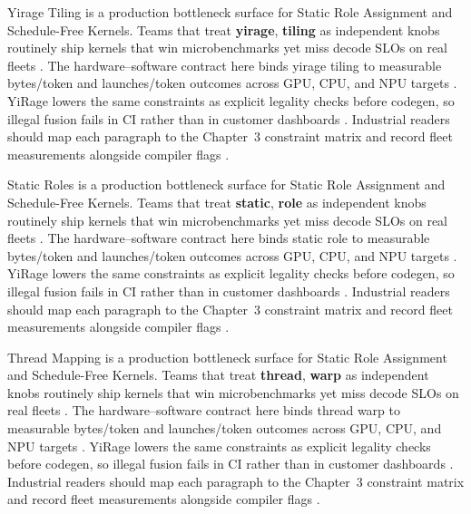 Yirage Tiling is a production bottleneck surface for Static Role Assignment and Schedule-Free Kernels. Teams that treat \textbf{yirage}, \textbf{tiling} as independent knobs routinely ship kernels that win microbenchmarks yet miss decode SLOs on real fleets \citep{liu2024deepseekv3,memoryfloor2026}. The hardware--software contract here binds yirage tiling to measurable bytes/token and launches/token outcomes across GPU, CPU, and NPU targets \citep{patel2025llminference,nvidia2022hopper}. YiRage lowers the same constraints as explicit legality checks before codegen, so illegal fusion fails in CI rather than in customer dashboards \citep{taxbreak2026,semianalysis2024tma}. Industrial readers should map each paragraph to the Chapter~3 constraint matrix and record fleet measurements alongside compiler flags \citep{memoryfloor2026,amd2024xdna}.

Static Roles is a production bottleneck surface for Static Role Assignment and Schedule-Free Kernels. Teams that treat \textbf{static}, \textbf{role} as independent knobs routinely ship kernels that win microbenchmarks yet miss decode SLOs on real fleets \citep{patel2025llminference,nvidia2022hopper}. The hardware--software contract here binds static role to measurable bytes/token and launches/token outcomes across GPU, CPU, and NPU targets \citep{taxbreak2026,semianalysis2024tma}. YiRage lowers the same constraints as explicit legality checks before codegen, so illegal fusion fails in CI rather than in customer dashboards \citep{memoryfloor2026,amd2024xdna}. Industrial readers should map each paragraph to the Chapter~3 constraint matrix and record fleet measurements alongside compiler flags \citep{nvidia2022hopper,amd2024aie}.

Thread Mapping is a production bottleneck surface for Static Role Assignment and Schedule-Free Kernels. Teams that treat \textbf{thread}, \textbf{warp} as independent knobs routinely ship kernels that win microbenchmarks yet miss decode SLOs on real fleets \citep{taxbreak2026,semianalysis2024tma}. The hardware--software contract here binds thread warp to measurable bytes/token and launches/token outcomes across GPU, CPU, and NPU targets \citep{memoryfloor2026,amd2024xdna}. YiRage lowers the same constraints as explicit legality checks before codegen, so illegal fusion fails in CI rather than in customer dashboards \citep{nvidia2022hopper,amd2024aie}. Industrial readers should map each paragraph to the Chapter~3 constraint matrix and record fleet measurements alongside compiler flags \citep{semianalysis2024tma,dlbook}.


